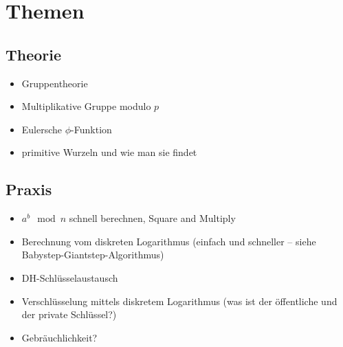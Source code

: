 \documentclass[
  a4paper,
  11pt,
]{article}
\title{}
\author{}
\begin{document}
\section*{Themen}
\label{sec:Themen}

\subsection*{Theorie}
\label{sub:Theorie}

\begin{itemize}
  \item Gruppentheorie
  \item Multiplikative Gruppe modulo $p$
  \item Eulersche $\phi$-Funktion
  \item primitive Wurzeln und wie man sie findet
\end{itemize}

\subsection*{Praxis}
\label{sub:Praxis}

\begin{itemize}
  \item $a^b \mod n$ schnell berechnen, Square and Multiply
  \item Berechnung vom diskreten Logarithmus (einfach und schneller – siehe
    Babystep-Giantstep-Algorithmus)
  \item DH-Schlüsselaustausch
  \item Verschlüsselung mittels diskretem Logarithmus (was ist der öffentliche
    und der private Schlüssel?)
  \item Gebräuchlichkeit?
\end{itemize}
\end{document}

